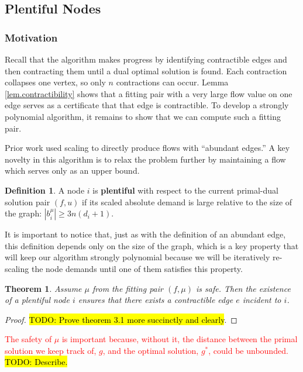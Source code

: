 \documentclass[11pt]{article}
\newtheorem{theorem}{Theorem}[section]
\theoremstyle{definition}
\newtheorem{definition}{Definition}[section]
\theoremstyle{definition}
\newcommand{\rewrite}[1]{\textcolor{red}{#1}}
\newcommand{\todo}[1]{\hl{TODO: #1}}
\begin{document}
	\subsection{Plentiful Nodes}

		\subsubsection{Motivation}
		
		Recall that the algorithm makes progress by
		identifying contractible edges and then contracting them until a dual optimal
		solution is found. Each contraction collapses one vertex, so only $n$ contractions
		can occur. Lemma \ref{lem.contractibility} shows that a fitting pair with a very
		large flow value on one edge serves as a certificate that that edge is contractible.
		To develop a strongly polynomial algorithm, it remains to show that we can compute
		such a fitting pair.
		
		Prior work used scaling to directly produce flows with ``abundant edges.''
		A key novelty in this algorithm is to relax the problem further by maintaining
		a flow which serves only as an upper bound.
		\begin{definition}
		A node $i$ is \textbf{plentiful} with respect
		to the current primal-dual solution pair $(f,u)$ if its scaled absolute
		demand is large relative to the size of the graph: $|b_i^{\mu}| \ge 3n(d_i + 1)$.
		\end{definition}
		
		It is important to notice that, just as with the definition of an abundant  edge,
		this definition depends only on the size of the graph, which is a key property
		that will keep our algorithm strongly polynomial because we will be iteratively
		re-scaling the node demands until one of them satisfies this property.
		
		\begin{theorem} Assume $\mu$ from the fitting pair $(f,\mu)$ is safe.
		Then the existence of a plentiful node $i$ ensures
		that there exists a contractible edge $e$ incident to $i$.
		\end{theorem}
		\begin{proof}
		\todo{Prove theorem 3.1 more succinctly and clearly}.
		\end{proof}
		
		\rewrite{The safety of $\mu$ is important because, without it, the distance between
		the primal solution we keep track of, $g$, and the optimal solution, $g^*$, could
		be unbounded.} \todo{Describe.}
		
\end{document}
